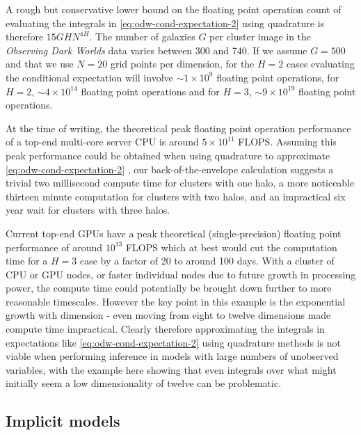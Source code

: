A rough but conservative lower bound on the floating point operation count of evaluating the integrals in \eqref{eq:odw-cond-expectation-2} using quadrature is therefore $15 GH N^{4H}$. The number of galaxies $G$ per cluster image in the \emph{Observing Dark Worlds} data varies between 300 and 740. If we assume $G=500$ and that we use $N=20$ grid points per dimension, for the $H=2$ cases evaluating the conditional expectation will involve $\sim 1\times 10^9$ floating point operations, for $H=2$, $\sim 4 \times 10^{14}$ floating point operations and for $H=3$, $\sim 9\times 10^{19}$ floating point operations.

At the time of writing, the theoretical peak floating point operation performance of a top-end multi-core server \ac{CPU} is around $5 \times 10^{11}$ \ac{FLOPS}. Assuming this peak performance could be obtained when using quadrature to approximate \eqref{eq:odw-cond-expectation-2}
, our back-of-the-envelope calculation suggests a trivial two millisecond compute time for clusters with one halo, a more noticeable thirteen minute computation for clusters with two halos, and an impractical six year wait for clusters with three halos.

Current top-end \acp{GPU} have a peak theoretical (single-precision) floating point performance of around $10^{13}$ \ac{FLOPS} which at best would cut the computation time for a $H=3$ case by a factor of 20 to around 100 days. With a cluster of \ac{CPU} or \ac{GPU} nodes, or faster individual nodes due to future growth in processing power, the compute time could potentially be brought down further to more reasonable timescales. However the key point in this example is the exponential growth with dimension - even moving from eight to twelve dimensions made compute time impractical. Clearly therefore approximating the integrals in expectations like \eqref{eq:odw-cond-expectation-2} using quadrature methods is not viable when performing inference in models with large numbers of unobserved variables, with the example here showing that even integrals over what might initially seem a low dimensionality of twelve can be problematic.

\subsection{Implicit models}\label{subsec:implicit-models}

